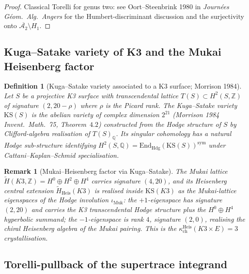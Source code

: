 \documentclass[11pt]{article}
\newtheorem{definition}[theorem]{Definition}
\newtheorem{remark}[theorem]{Remark}
\providecommand{\cA}{\mathcal{A}}
\providecommand{\ZZ}{\mathbb{Z}}
\providecommand{\QQ}{\mathbb{Q}}
\providecommand{\kch}{\kappa_{\mathrm{ch}}}
\begin{document}
\begin{proof}
Classical Torelli for genus two: see Oort--Steenbrink 1980 in
\emph{Journ\'ees G\'eom.\ Alg.\ Angers} for the Humbert-discriminant
discussion and the surjectivity onto $\overline{\cA_2} \setminus H_1$.
\end{proof}

\subsection{Kuga--Satake variety of K3 and the Mukai Heisenberg factor}

\begin{definition}[Kuga--Satake variety associated to a K3 surface; Morrison 1984]
\label{def:kuga-satake-k3e-BL-2}
Let $S$ be a projective K3 surface with transcendental lattice
$T(S) \subset H^2(S, \ZZ)$ of signature $(2, 20 - \rho)$ where $\rho$
is the Picard rank. The \emph{Kuga--Satake variety} $\mathrm{KS}(S)$ is
the abelian variety of complex dimension $2^{21}$ (Morrison 1984
\emph{Invent.\ Math.}~75, Theorem~$4.2$) constructed from the
Hodge structure of $S$ by Clifford-algebra realisation of
$T(S)_{\QQ}$. Its singular cohomology has a natural Hodge
sub-structure identifying $H^2(S, \QQ) = \mathrm{End}_{\mathrm{Hdg}}(\mathrm{KS}(S))^{\mathrm{sym}}$
under Cattani--Kaplan--Schmid specialisation.
\end{definition}

\begin{remark}[Mukai--Heisenberg factor via Kuga--Satake]
The Mukai lattice $\widetilde H(K3, \ZZ) = H^0 \oplus H^2 \oplus H^4$
carries signature $(4, 20)$, and its Heisenberg central extension
$\widetilde{H}_{\mathrm{Heis}}(K3)$ is realised inside $\mathrm{KS}(K3)$
as the Mukai-lattice eigenspaces of the Hodge involution
$\iota_{\mathrm{Muk}}$: the $+1$-eigenspace has signature $(2, 20)$
and carries the K3 transcendental Hodge structure plus the $H^0 \oplus H^4$
hyperbolic summand; the $-1$-eigenspace is rank $4$, signature $(2, 0)$,
realising the chiral Heisenberg algebra of the Mukai pairing.
This is the $\kch^{\mathrm{Heis}}(K3 \times E) = 3$ crystallisation.
\end{remark}

\subsection{Torelli-pullback of the supertrace integrand}
\end{document}
